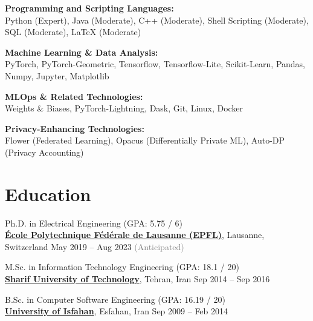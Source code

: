 \documentclass[11pt]{article}
\begin{document}
\begin{outerlist}
	\item \textbf{Programming and Scripting Languages:}\\
	{Python (Expert), Java (Moderate), C++ (Moderate), Shell Scripting (Moderate), SQL (Moderate), LaTeX (Moderate)}

	\item \textbf{Machine Learning \& Data Analysis:}\\
	{PyTorch, PyTorch-Geometric, Tensorflow, Tensorflow-Lite, Scikit-Learn, Pandas, Numpy, Jupyter, Matplotlib}

	\item \textbf{MLOps \& Related Technologies:}\\
	{Weights \& Biases, PyTorch-Lightning, Dask, Git, Linux, Docker}

	\item \textbf{Privacy-Enhancing Technologies:}\\
	{Flower (Federated Learning), Opacus (Differentially Private ML), Auto-DP (Privacy Accounting)}

\end{outerlist}


\section{Education}
\begin{outerlist}

	\item Ph.D. in Electrical Engineering (GPA: 5.75 / 6)\\
	\href{https://www.epfl.ch/en/home/}{\textbf{École Polytechnique Fédérale de Lausanne (EPFL)}}, Lausanne, Switzerland \hfill {May 2019 -- Aug 2023 \textcolor{gray}{(Anticipated)}}

	\item M.Sc. in Information Technology Engineering (GPA: 18.1 / 20)\\
	\href{http://www.en.sharif.edu/}{\textbf{Sharif University of Technology}}, Tehran, Iran \hfill {Sep 2014 -- Sep 2016}

	\item B.Sc. in Computer Software Engineering (GPA: 16.19 / 20)\\
	\href{http://ui.ac.ir/EN}{\textbf{University of Isfahan}}, Esfahan, Iran \hfill {Sep 2009 -- Feb 2014}

\end{outerlist}
\end{document}
